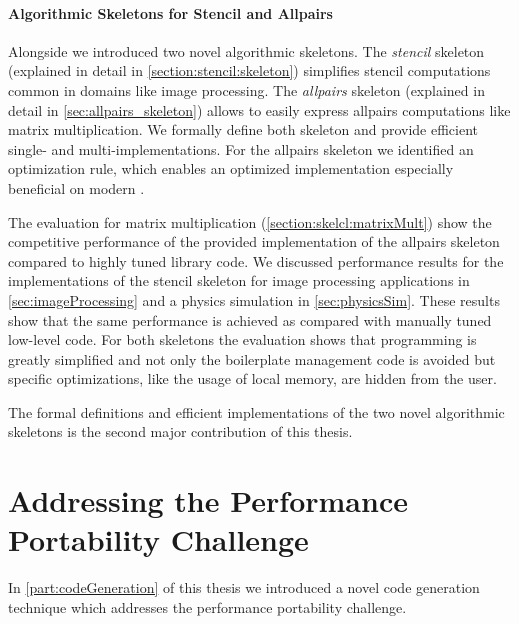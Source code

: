 \paragraph{Algorithmic Skeletons for Stencil and Allpairs}
Alongside \SkelCL we introduced two novel algorithmic skeletons.
The \emph{stencil} skeleton (explained in detail in \autoref{section:stencil:skeleton}) simplifies stencil computations common in domains like image processing.
The \emph{allpairs} skeleton (explained in detail in \autoref{sec:allpairs_skeleton}) allows to easily express allpairs computations like matrix multiplication.
We formally define both skeleton and provide efficient single- and multi-\GPU implementations.
For the allpairs skeleton we identified an optimization rule, which enables an optimized implementation especially beneficial on modern \GPUs.

The evaluation for matrix multiplication (\autoref{section:skelcl:matrixMult}) show the competitive performance of the provided implementation of the allpairs skeleton compared to highly tuned library code.
We discussed performance results for the implementations of the stencil skeleton for image processing applications in \autoref{sec:imageProcessing} and a physics simulation in \autoref{sec:physicsSim}.
These results show that the same performance is achieved as compared with manually tuned low-level \OpenCL code.
For both skeletons the evaluation shows that programming is greatly simplified and not only the boilerplate management code is avoided but \GPU specific optimizations, like the usage of local memory, are hidden from the user.

\bigskip
The formal definitions and efficient \GPU implementations of the two novel algorithmic skeletons is the second major contribution of this thesis.


\section{Addressing the Performance Portability Challenge}
In \autoref{part:codeGeneration} of this thesis we introduced a novel code generation technique which addresses the performance portability challenge.

